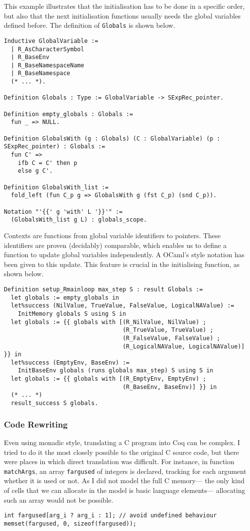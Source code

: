 \documentclass{article}
\newcommand\Coq{Coq}
\newcommand\OCaml{OCaml}
\newcommand\Cn{C}
\begin{document}
This example illustrates that the initialisation has to be done
in a specific order, but also that the next initialisation functions
usually needs the global variables defined before.
The definition of \texttt{Globals} is shown below.
\begin{verbatim}
Inductive GlobalVariable :=
  | R_AsCharacterSymbol
  | R_BaseEnv
  | R_BaseNamespaceName
  | R_BaseNamespace
  (* ... *).

Definition Globals : Type := GlobalVariable -> SExpRec_pointer.

Definition empty_globals : Globals :=
  fun _ => NULL.

Definition GlobalsWith (g : Globals) (C : GlobalVariable) (p : SExpRec_pointer) : Globals :=
  fun C' =>
    ifb C = C' then p
    else g C'.

Definition GlobalsWith_list :=
  fold_left (fun C_p g => GlobalsWith g (fst C_p) (snd C_p)).

Notation "'{{' g 'with' L '}}'" :=
  (GlobalsWith_list g L) : globals_scope.
\end{verbatim}
Contexts are functions from global variable identifiers to pointers.
These identifiers are proven (decidably) comparable,
which enables us to define a function to update global variables independently.
A \OCaml{}’s style notation has been given to this update.
This feature is crucial in the initialising function, as shown below.
\begin{verbatim}
Definition setup_Rmainloop max_step S : result Globals :=
  let globals := empty_globals in
  let%success (NilValue, TrueValue, FalseValue, LogicalNAValue) :=
    InitMemory globals S using S in
  let globals := {{ globals with [(R_NilValue, NilValue) ;
                                  (R_TrueValue, TrueValue) ;
                                  (R_FalseValue, FalseValue) ;
                                  (R_LogicalNAValue, LogicalNAValue)] }} in
  let%success (EmptyEnv, BaseEnv) :=
    InitBaseEnv globals (runs globals max_step) S using S in
  let globals := {{ globals with [(R_EmptyEnv, EmptyEnv) ;
                                  (R_BaseEnv, BaseEnv)] }} in
  (* ... *)
  result_success S globals.
\end{verbatim}


\subsubsection{Code Rewriting}

Even using monadic style,
translating a \Cn{} program into \Coq{} can be complex.
I tried to do it the most closely possible to the original
\Cn{} source code,
but there were places in which direct translation was difficult.
For instance, in function \texttt{matchArgs},
an array \texttt{fargused} of integers is declared,
tracking for each argument whether it is used or not.
As I did not model the full \Cn{} memory—%
the only kind of cells that we can allocate in the model
is basic language elements—%
allocating such an array would not be possible.
\begin{verbatim}
int fargused[arg_i ? arg_i : 1]; // avoid undefined behaviour
memset(fargused, 0, sizeof(fargused));
\end{verbatim}
\end{document}
